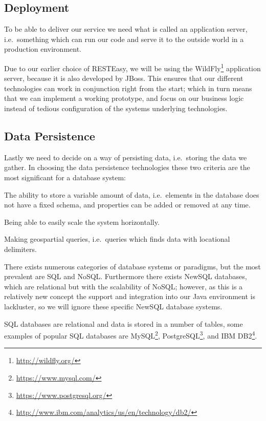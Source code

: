 \subsection{Deployment}
To be able to deliver our service we need what is called an application server, i.e.~something which can run our code and serve it to the outside world in a production environment.

Due to our earlier choice of RESTEasy, we will be using the WildFly\footnote{\url{http://wildfly.org/}} application server, because it is also developed by JBoss.
This ensures that our different technologies can work in conjunction right from the start;
which in turn means that we can implement a working prototype, and focus on our business logic instead of tedious configuration of the systems underlying technologies.

\subsection{Data Persistence}
Lastly we need to decide on a way of persisting data, i.e.~storing the data we gather.
In choosing the data persistence technologies these two criteria are the most significant for a database system:
\begin{eletterate}
    \item The ability to store a variable amount of data, i.e.~elements in the database does not have a fixed schema, and properties can be added or removed at any time.
    \item Being able to easily scale the system horizontally.
    \item Making geospartial queries, i.e.~queries which finds data with locational delimiters.
\end{eletterate}

\bigskip
There exists numerous categories of database systems or paradigms, but the most prevalent are SQL and NoSQL.
Furthermore there exists NewSQL databases, which are relational but with the scalability of NoSQL;
however, as this is a relatively new concept the support and integration into our Java environment is lackluster, so we will ignore these specific NewSQL database systems.

SQL databases are relational and data is stored in a number of tables, some examples of popular SQL databases are MySQL\footnote{\url{https://www.mysql.com/}}, PostgreSQL\footnote{\url{https://www.postgresql.org/}}, and IBM DB2\footnote{\url{http://www.ibm.com/analytics/us/en/technology/db2/}}.\cite{DB_RANKINGS}

